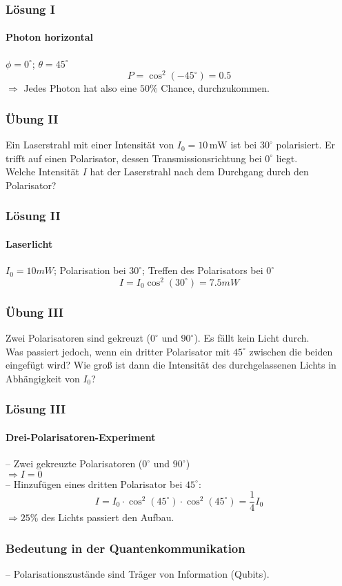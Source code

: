 \begin{frame}
	\frametitle{L{\"o}sung I}
	\framesubtitle{Photon horizontal}
	$\phi = 0^\circ$; $\theta = 45^\circ$
	\[
		\mathit{P} = \cos^2(-45^\circ) = 0.5
	\]
	$\Rightarrow$ Jedes Photon hat also eine $50\%$ Chance, durchzukommen.
\end{frame}

\begin{frame}
	\frametitle{{\"U}bung II}
	Ein Laserstrahl mit einer Intensität von $I_0 = 10 \,\text{mW}$ ist bei $30^\circ$ polarisiert. Er trifft auf einen Polarisator, dessen Transmissionsrichtung bei $0^\circ$ liegt.\\
	Welche Intensität $I$ hat der Laserstrahl nach dem Durchgang durch den Polarisator?
\end{frame}

\begin{frame}
	\frametitle{L{\"o}sung II}
	\framesubtitle{Laserlicht}
	$I_0 = 10 mW$; Polarisation bei $30^\circ$; Treffen des Polarisators bei $0^\circ$
	\[
		I = I_0 \cos^2(30^\circ) = 7.5 mW
	\]
\end{frame}

\begin{frame}
	\frametitle{{\"U}bung III}
	Zwei Polarisatoren sind gekreuzt ($0^\circ$ und $90^\circ$). 
	Es fällt kein Licht durch. \\
	Was passiert jedoch, wenn ein dritter Polarisator mit $45^\circ$ zwischen die beiden eingefügt wird? 
	Wie groß ist dann die Intensität des durchgelassenen Lichts in Abhängigkeit von $I_0$?
\end{frame}


\begin{frame}
	\frametitle{L{\"o}sung III}
	\framesubtitle{Drei-Polarisatoren-Experiment}
	 -- Zwei gekreuzte Polarisatoren ($0^\circ$ und $90^\circ$)\\
	 \hspace{0.5em} $\Rightarrow I = 0$ \\
	 -- Hinzufügen eines dritten Polarisator bei $45^\circ$:\\
	 \[
	 	I = I_0 \cdot \cos^2(45^\circ) \cdot \cos^2(45^\circ) = \frac{1}{4}I_0 
	 \]
	 $\Rightarrow 25\%$ des Lichts passiert den Aufbau.
\end{frame}

\begin{frame}
	\frametitle{Bedeutung in der Quantenkommunikation}
	--  Polarisationszustände sind Träger von Information (Qubits).
\end{frame}